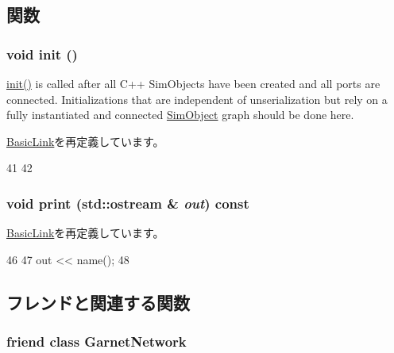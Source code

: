 \subsection{関数}
\hypertarget{classGarnetIntLink_a02fd73d861ef2e4aabb38c0c9ff82947}{
\subsubsection[{init}]{\setlength{\rightskip}{0pt plus 5cm}void init ()}}
\label{classGarnetIntLink_a02fd73d861ef2e4aabb38c0c9ff82947}
\hyperlink{classGarnetIntLink_a02fd73d861ef2e4aabb38c0c9ff82947}{init()} is called after all C++ SimObjects have been created and all ports are connected. Initializations that are independent of unserialization but rely on a fully instantiated and connected \hyperlink{classSimObject}{SimObject} graph should be done here. 

\hyperlink{classBasicLink_a02fd73d861ef2e4aabb38c0c9ff82947}{BasicLink}を再定義しています。


\begin{DoxyCode}
41 {
42 }
\end{DoxyCode}
\hypertarget{classGarnetIntLink_ac55fe386a101fbae38c716067c9966a0}{
\subsubsection[{print}]{\setlength{\rightskip}{0pt plus 5cm}void print (std::ostream \& {\em out}) const}}
\label{classGarnetIntLink_ac55fe386a101fbae38c716067c9966a0}


\hyperlink{classBasicLink_ac55fe386a101fbae38c716067c9966a0}{BasicLink}を再定義しています。


\begin{DoxyCode}
46 {
47     out << name();
48 }
\end{DoxyCode}


\subsection{フレンドと関連する関数}
\hypertarget{classGarnetIntLink_a93e18c390666ec9c26269c22345e9e94}{
\subsubsection[{GarnetNetwork}]{\setlength{\rightskip}{0pt plus 5cm}friend class {\bf GarnetNetwork}}}
\label{classGarnetIntLink_a93e18c390666ec9c26269c22345e9e94}


